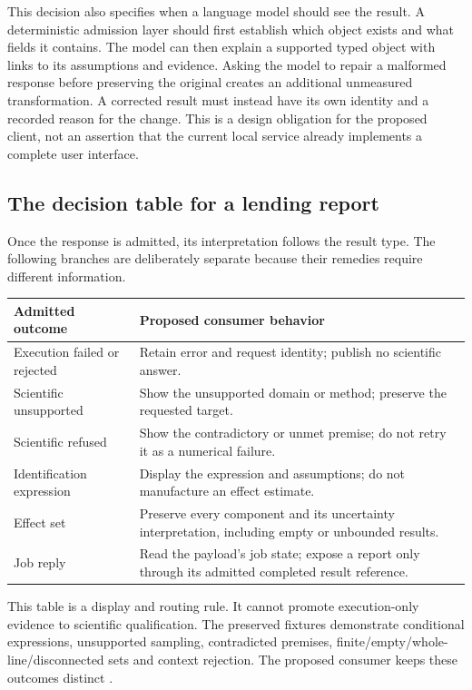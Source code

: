 This decision also specifies when a language model should see the result.
A deterministic admission layer should first establish which object exists
and what fields it contains. The model can then explain a supported typed
object with links to its assumptions and evidence. Asking the model to repair
a malformed response before preserving the original creates an additional
unmeasured transformation. A corrected result must instead have its own
identity and a recorded reason for the change. This is a design obligation
for the proposed client, not an assertion that the current local service
already implements a complete user interface.

\subsection{The decision table for a lending report}

Once the response is admitted, its interpretation follows the result type.
The following branches are deliberately separate because their remedies
require different information.
\begin{center}
\begin{tabularx}{\textwidth}{P{.24\textwidth}X}
\toprule
Admitted outcome & Proposed consumer behavior \\
\midrule
Execution failed or rejected & Retain error and request identity; publish no scientific answer. \\
Scientific unsupported & Show the unsupported domain or method; preserve the requested target. \\
Scientific refused & Show the contradictory or unmet premise; do not retry it as a numerical failure. \\
Identification expression & Display the expression and assumptions; do not manufacture an effect estimate. \\
Effect set & Preserve every component and its uncertainty interpretation, including empty or unbounded results. \\
Job reply & Read the payload's job state; expose a report only through its admitted completed result reference. \\
\bottomrule
\end{tabularx}
\end{center}
This table is a display and routing rule. It cannot promote execution-only
evidence to scientific qualification. The preserved fixtures demonstrate
conditional expressions, unsupported sampling, contradicted premises,
finite/empty/whole-line/disconnected sets and context rejection. The proposed
consumer keeps these outcomes distinct
\citep{exec13_i2_examples,exec17_integration_review_reference}.

